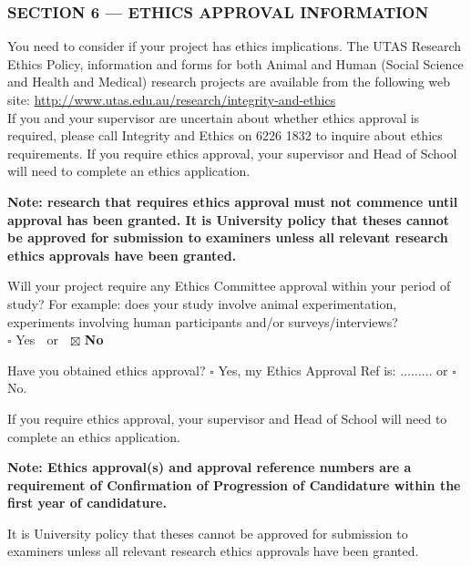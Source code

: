 \documentclass[11pt,a4paper,oneside]{report}
\begin{document}
\subsubsection*{SECTION 6 --- ETHICS APPROVAL INFORMATION}
You need to consider if your project has ethics implications. The UTAS Research Ethics Policy, information and forms for both Animal and Human (Social Science and Health and Medical) research projects are available from the following web site: \url{http://www.utas.edu.au/research/integrity-and-ethics}\\
\clearpage
If you and your supervisor are uncertain about whether ethics approval is required, please call Integrity and Ethics on 6226 1832 to inquire about ethics requirements. If you require ethics approval, your supervisor and Head of School will need to complete an ethics application.

\textbf{Note: research that requires ethics approval must not commence until approval has been granted. It is University policy that theses cannot be approved for submission to examiners unless all relevant research ethics approvals have been granted.}

\begin{mdframed}[everyline=true,splittopskip=20pt,splitbottomskip=20pt]
\vspace{3ex}
Will your project require any Ethics Committee approval within your period of study?  For example: does your study involve animal experimentation, experiments involving human participants and/or surveys/interviews? \\
$\square$ Yes $\;$ or $\;$ $\boxtimes$ \textbf{No}

Have you obtained ethics approval? $\square$ Yes, my Ethics Approval Ref is: $\ldots\ldots\ldots$ or $\square$ No.

If you require ethics approval, your supervisor and Head of School will need to complete an ethics application.  

\textbf{Note: Ethics approval(s) and approval reference numbers are a requirement of Confirmation of Progression of Candidature within the first year of candidature.}

It is University policy that theses cannot be approved for submission to examiners unless all relevant research ethics approvals have been granted.

\vspace{3ex}
\end{mdframed}
\end{document}
